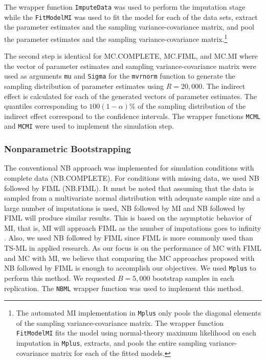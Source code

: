 \documentclass[man]{apa7}\usepackage[]{graphicx}\usepackage[]{xcolor}
\begin{document}






\noindent The wrapper function \texttt{ImputeData} was used to perform the imputation stage while the \texttt{FitModelMI}
was used to fit the model for each of the data sets,
extract the parameter estimates and the sampling variance-covariance matrix,
and pool the parameter estimates and the sampling variance-covariance matrix.\footnote{The automated MI implementation in \texttt{Mplus} only pools the diagonal elements of the sampling variance-covariance matrix.
	The wrapper function \texttt{FitModelMI} fits the model using normal-theory maximum likelihood on each imputation in \texttt{Mplus},
extracts, and pools the entire sampling variance-covariance matrix for each of the fitted models.}

The second step is identical for MC.COMPLETE,
MC.FIML,
and MC.MI
where the vector of parameter estimates and sampling variance-covariance matrix
were used as arguments \texttt{mu} and \texttt{Sigma} for the \texttt{mvrnorm} function
to generate the sampling distribution of parameter estimates using $R = 20,000$.
The indirect effect is calculated for each of the generated vectors of parameter estimates. 
The quantiles corresponding to $100 \left(1 - \alpha \right) \%$ of the sampling distribution of the indirect effect correspond to the confidence intervals.
The wrapper functions \texttt{MCML} and \texttt{MCMI} were used to implement the simulation step.

\subsubsection{Nonparametric Bootstrapping}

The conventional NB approach was implemented for simulation conditions with complete data (NB.COMPLETE).
For conditions with missing data,
we used NB followed by FIML (NB.FIML).
It must be noted that assuming that the data is sampled from a multivariate normal distribution with adequate sample size
and a large number of imputations is used,
NB followed by MI and NB followed by FIML will produce similar results.
This is based on the asymptotic behavior of MI,
that is,
MI will approach FIML as the number of imputations goes to infinity
\parencite{Lib-Missing-Data-Multiple-Imputation-Graham-2007}.
Also,
we used NB followed by FIML since FIML is more commonly used than TS-ML in applied research.
As our focus is on the performance of MC with FIML and MC with MI,
we believe that comparing the MC approaches proposed with NB followed by FIML
is enough to accomplish our objectives.
We used \texttt{Mplus} to perform this method.
We requested $B = 5,000$ bootstrap samples in each replication.
The \texttt{NBML} wrapper function was used to implement this method.
\end{document}
